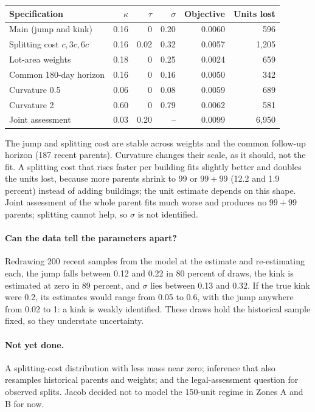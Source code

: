 \begin{center}
\small
\begin{tabular}{lrrrrr}
\hline
Specification & $\kappa$ & $\tau$ & $\sigma$ & Objective & Units lost \\
\hline
Main (jump and kink) & 0.16 & 0 & 0.20 & 0.0060 & 596 \\
Splitting cost $c, 3c, 6c$ & 0.16 & 0.02 & 0.32 & 0.0057 & 1,205 \\
Lot-area weights & 0.18 & 0 & 0.25 & 0.0024 & 659 \\
Common 180-day horizon & 0.16 & 0 & 0.16 & 0.0050 & 342 \\
Curvature 0.5 & 0.06 & 0 & 0.08 & 0.0059 & 689 \\
Curvature 2 & 0.60 & 0 & 0.79 & 0.0062 & 581 \\
Joint assessment & 0.03 & 0.20 & -- & 0.0099 & 6,950 \\
\hline
\end{tabular}
\end{center}

The jump and splitting cost are stable across weights and the common
follow-up horizon (187 recent parents). Curvature changes their scale, as it
should, not the fit. A splitting cost that rises faster per building fits
slightly better and doubles the units lost, because more parents shrink to
99 or $99+99$ (12.2 and 1.9 percent) instead of adding buildings; the unit
estimate depends on this shape.
Joint assessment of the whole parent fits much worse and produces no $99+99$
parents; splitting cannot help, so $\sigma$ is not identified.

\paragraph{Can the data tell the parameters apart?} Redrawing 200 recent
samples from the model at the estimate and re-estimating each, the jump falls
between 0.12 and 0.22 in 80 percent of draws, the kink is estimated at zero in
89 percent, and $\sigma$ lies between 0.13 and 0.32. If the true kink were 0.2,
its estimates would range from 0.05 to 0.6, with the jump anywhere from 0.02 to
1: a kink is weakly identified. These draws hold the historical sample fixed,
so they understate uncertainty.

\paragraph{Not yet done.} A splitting-cost distribution with less mass near
zero; inference that also resamples historical parents and weights; and the
legal-assessment question for observed splits. Jacob decided not to model the
150-unit regime in Zones A and B for now.

